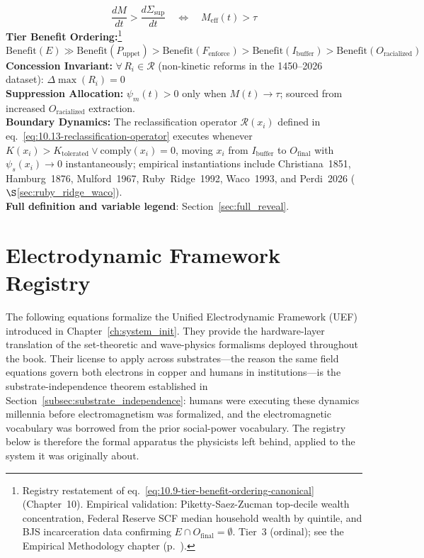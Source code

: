 \begin{definition}
\begin{equation}\label{eq:19.3-crash-condition-registry-entry}
\frac{dM}{dt} > \frac{d\Sigma_{\text{sup}}}{dt} \quad \Longleftrightarrow \quad M_{\text{eff}}(t) > \tau
\end{equation}
\textbf{Tier Benefit Ordering:}\footnote{Registry restatement of eq.~\eqref{eq:10.9-tier-benefit-ordering-canonical} (Chapter~10). Empirical validation: Piketty-Saez-Zucman top-decile wealth concentration, Federal Reserve SCF median household wealth by quintile, and BJS incarceration data confirming $E \cap O_{\text{final}} = \emptyset$. Tier~3 (ordinal); see the Empirical Methodology chapter (p.~\pageref{ch:empirical_methodology}).}
\begin{equation}\label{eq:19.4-tier-ordering-registry-entry}
\text{Benefit}(E) \gg \text{Benefit}(P_{\text{uppet}}) > \text{Benefit}(F_{\text{enforce}}) > \text{Benefit}(I_{\text{buffer}}) > \text{Benefit}(O_{\text{racialized}})
\end{equation}
\textbf{Concession Invariant:} $\forall\, R_i \in \mathcal{R}$ (non-kinetic reforms in the 1450--2026 dataset): $\Delta\max(R_i) = 0$\\
\textbf{Suppression Allocation:} $\psi_m(t) > 0$ only when $M(t) \to \tau$; sourced from increased $O_{\text{racialized}}$ extraction.\\
\textbf{Boundary Dynamics:} The reclassification operator $\mathcal{R}(x_i)$ defined in eq.~\eqref{eq:10.13-reclassification-operator} executes whenever $K(x_i) > K_{\text{tolerated}} \vee \mathrm{comply}(x_i) = 0$, moving $x_i$ from $I_{\text{buffer}}$ to $O_{\text{final}}$ with $\psi_s(x_i) \to 0$ instantaneously; empirical instantiations include Christiana~1851, Hamburg~1876, Mulford~1967, Ruby~Ridge~1992, Waco~1993, and Perdi~2026 ($\S$\ref{sec:ruby_ridge_waco}).\\
\textbf{Full definition and variable legend}: Section~\ref{sec:full_reveal}.
\end{definition}

\section{Electrodynamic Framework Registry}

The following equations formalize the Unified Electrodynamic Framework (UEF)
introduced in Chapter~\ref{ch:system_init}. They provide the hardware-layer
translation of the set-theoretic and wave-physics formalisms deployed
throughout the book. Their license to apply across substrates---the
reason the same field equations govern both electrons in copper and
humans in institutions---is the substrate-independence theorem
established in Section~\ref{subsec:substrate_independence}: humans were
executing these dynamics millennia before electromagnetism was
formalized, and the electromagnetic vocabulary was borrowed from the
prior social-power vocabulary. The registry
below is therefore the formal apparatus the physicists left behind,
applied to the system it was originally about.

